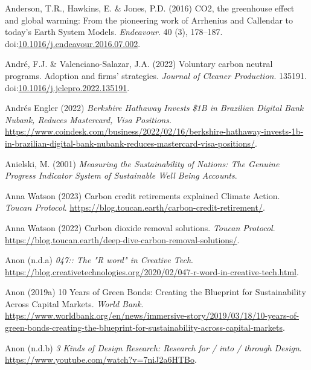 \documentclass[
  letterpaper,
  DIV=11,
  numbers=noendperiod]{scrartcl}
\newlength{\cslhangindent}
\newenvironment{CSLReferences}[2] %
 {\begin{list}{}{%
  \setlength{\itemindent}{0pt}
  \setlength{\leftmargin}{0pt}
  \setlength{\parsep}{0pt}
  \ifodd #1
   \setlength{\leftmargin}{\cslhangindent}
   \setlength{\itemindent}{-1\cslhangindent}
  \fi
  \setlength{\itemsep}{#2\baselineskip}}}
 {\end{list}}
\begin{document}
\begin{CSLReferences}{0}{1}
Anderson, T.R., Hawkins, E. \& Jones, P.D. (2016) {CO2}, the greenhouse
effect and global warming: From the pioneering work of {Arrhenius} and
{Callendar} to today's {Earth System Models}. \emph{Endeavour}. 40 (3),
178--187.
doi:\href{https://doi.org/10.1016/j.endeavour.2016.07.002}{10.1016/j.endeavour.2016.07.002}.

André, F.J. \& Valenciano-Salazar, J.A. (2022) Voluntary carbon neutral
programs. {Adoption} and firms' strategies. \emph{Journal of Cleaner
Production}. 135191.
doi:\href{https://doi.org/10.1016/j.jclepro.2022.135191}{10.1016/j.jclepro.2022.135191}.

Andrés Engler (2022) \emph{Berkshire {Hathaway Invests} \${1B} in
{Brazilian Digital Bank Nubank}, {Reduces Mastercard}, {Visa
Positions}}.
\url{https://www.coindesk.com/business/2022/02/16/berkshire-hathaway-invests-1b-in-brazilian-digital-bank-nubank-reduces-mastercard-visa-positions/}.

Anielski, M. (2001) \emph{Measuring the {Sustainability} of {Nations}:
{The Genuine Progress Indicator System} of {Sustainable Well Being
Accounts}}.

Anna Watson (2023) Carbon credit retirements explained {\textbar}
{Climate Action}. \emph{Toucan Protocol}.
\url{https://blog.toucan.earth/carbon-credit-retirement/}.

Anna Watson (2022) Carbon dioxide removal solutions. \emph{Toucan
Protocol}.
\url{https://blog.toucan.earth/deep-dive-carbon-removal-solutions/}.

Anon (n.d.a) \emph{047:: {The} "{R} word" in {Creative Tech}}.
\url{https://blog.creativetechnologies.org/2020/02/047-r-word-in-creative-tech.html}.

Anon (2019a) 10 {Years} of {Green Bonds}: {Creating} the {Blueprint} for
{Sustainability Across Capital Markets}. \emph{World Bank}.
\url{https://www.worldbank.org/en/news/immersive-story/2019/03/18/10-years-of-green-bonds-creating-the-blueprint-for-sustainability-across-capital-markets}.

Anon (n.d.b) \emph{3 {Kinds} of {Design Research}: {Research} for / into
/ through {Design}}. \url{https://www.youtube.com/watch?v=7niJ2a6HTBo}.


\end{CSLReferences}
\end{document}
